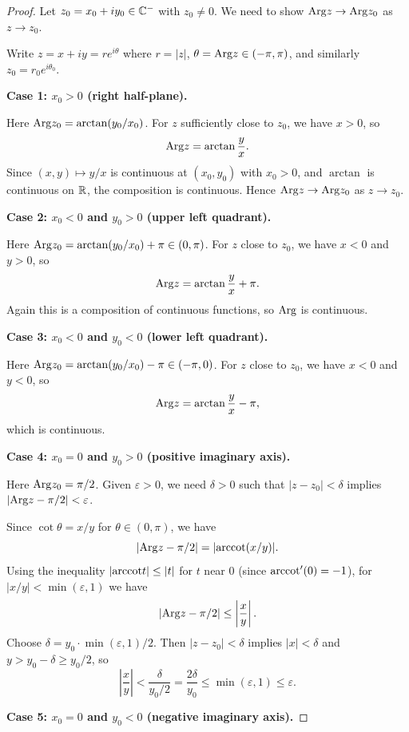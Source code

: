 \documentclass{article}
\begin{document}
\begin{proof}
  Let $z_0 = x_0 + iy_0 \in \mathbb{C}^-$ with $z_0 \ne 0$.
  We need to show $\mathrm{Arg} z \to \mathrm{Arg} z_0$ as $z \to z_0$.

  Write $z = x + iy = re^{i\theta}$ where $r = |z|$, $\theta = \mathrm{Arg} z
  \in (-\pi, \pi)$,
  and similarly $z_0 = r_0 e^{i\theta_0}$.

  \textbf{Case 1: $x_0 > 0$ (right half-plane).}

  Here $\mathrm{Arg} z_0 = \arctan(y_0/x_0)$.
  For $z$ sufficiently close to $z_0$, we have $x > 0$, so
  \[
    \mathrm{Arg} z = \arctan\frac{y}{x}.
  \]
  Since $(x,y) \mapsto y/x$ is continuous at $(x_0,y_0)$ with $x_0 > 0$,
  and $\arctan$ is continuous on $\mathbb{R}$, the composition is continuous.
  Hence $\mathrm{Arg} z \to \mathrm{Arg} z_0$ as $z \to z_0$.

  \textbf{Case 2: $x_0 < 0$ and $y_0 > 0$ (upper left quadrant).}

  Here $\mathrm{Arg} z_0 = \arctan(y_0/x_0) + \pi \in (0,\pi)$.
  For $z$ close to $z_0$, we have $x < 0$ and $y > 0$, so
  \[
    \mathrm{Arg} z = \arctan\frac{y}{x} + \pi.
  \]
  Again this is a composition of continuous functions, so $\mathrm{Arg}$ is continuous.

  \textbf{Case 3: $x_0 < 0$ and $y_0 < 0$ (lower left quadrant).}

  Here $\mathrm{Arg} z_0 = \arctan(y_0/x_0) - \pi \in (-\pi, 0)$.
  For $z$ close to $z_0$, we have $x < 0$ and $y < 0$, so
  \[
    \mathrm{Arg} z = \arctan\frac{y}{x} - \pi,
  \]
  which is continuous.

  \textbf{Case 4: $x_0 = 0$ and $y_0 > 0$ (positive imaginary axis).}

  Here $\mathrm{Arg} z_0 = \pi/2$. Given $\varepsilon > 0$, we need $\delta >
  0$ such that
  $|z - z_0| < \delta$ implies $|\mathrm{Arg} z - \pi/2| < \varepsilon$.

  Since $\cot\theta = x/y$ for $\theta \in (0,\pi)$, we have
  \[
    |\mathrm{Arg} z - \pi/2| = |\mathrm{arccot}(x/y)|.
  \]
  Using the inequality $|\mathrm{arccot} t| \le |t|$ for $t$ near $0$ (since
  $\mathrm{arccot}'(0) = -1$),
  for $|x/y| < \min(\varepsilon, 1)$ we have
  \[
    |\mathrm{Arg} z - \pi/2| \le \left|\frac{x}{y}\right|.
  \]
  Choose $\delta = y_0 \cdot \min(\varepsilon, 1)/2$. Then $|z - z_0|
  < \delta$ implies
  $|x| < \delta$ and $y > y_0 - \delta \ge y_0/2$, so
  \[
    \left|\frac{x}{y}\right| < \frac{\delta}{y_0/2}
    = \frac{2\delta}{y_0}
    \le \min(\varepsilon, 1) \le \varepsilon.
  \]

  \textbf{Case 5: $x_0 = 0$ and $y_0 < 0$ (negative imaginary axis).}


\end{proof}
\end{document}
